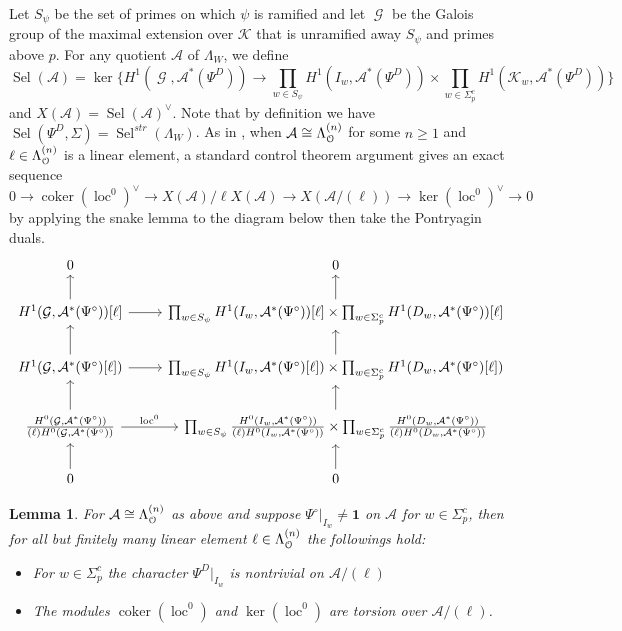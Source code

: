 \documentclass[leqno]{amsart}
\newtheorem{lem}[thm]{Lemma}
\theoremstyle{definition}
\theoremstyle{remark}
\newcommand{\id}{\mathbf{1}}
\newcommand{\eo}{\EuScript{O}}
\DeclareMathOperator{\coker}{coker}
\DeclareMathOperator{\Gal}{\mathcal{G}}
\newcommand{\K}{{\mathcal{K}}} %
\DeclareMathOperator{\loc}{loc}
\DeclareMathOperator{\Sel}{Sel}
\newcommand{\Lda}[1]{\Lambda^{(#1)}}
\begin{document}
Let $S_\psi$ be the set of primes on which $\psi$ is ramified
and let $\Gal$ be the Galois group of the maximal extension
over $\K$ that is unramified away $S_\psi$ and primes above $p$.
For any quotient $\mathcal{A}$ of $\Lambda_W$, we define 
\begin{equation}
    \Sel(\mathcal{A})=
    \ker\big\{
    H^1(\Gal, \mathcal{A}^*(\Psi^D))\to
    \prod_{w\in S_\psi}
    H^1(I_w,\mathcal{A}^*(\Psi^D))\times 
    \prod_{w\in \Sigma_p^c}
    H^1(\K_w,\mathcal{A}^*(\Psi^D))
    \big\}
\end{equation}
and $X(\mathcal{A})=\Sel(\mathcal{A})^\vee$.
Note that by definition we have
$\Sel(\Psi^D,\Sigma)=\Sel^{str}(\Lambda_W)$.
As in \cite[Prop 2.6]{Hsieh2010},
when $\mathcal{A}\cong \Lda{n}_{\eo}$ for some $n\geq 1$
and $\ell\in\Lda{n}_{\eo}$ is a linear element,
a standard control theorem argument gives an exact sequence
$0\to \coker(\loc^0)^\vee\to X(\mathcal{A})/\ell X(\mathcal{A})
\to X(\mathcal{A}/(\ell))\to \ker(\loc^0)^\vee\to 0$
by applying the snake lemma to the diagram below
then take the Pontryagin duals.
\[
\begin{tikzcd}
0 & 0\\
H^1(\Gal,\mathcal{A}^*(\Psi^\circ))[\ell] \arrow[u]\arrow[r] &
\prod_{w\in S_\psi}
H^1(I_w,\mathcal{A}^*(\Psi^\circ))[\ell]\times
\prod_{w\in\Sigma_p^c}
H^1(D_w,\mathcal{A}^*(\Psi^\circ))[\ell] \arrow[u]\\
H^1(\Gal,\mathcal{A}^*(\Psi^\circ)[\ell]) \arrow[u]\arrow[r] &
\prod_{w\in S_\psi}
H^1(I_w,\mathcal{A}^*(\Psi^\circ)[\ell])\times
\prod_{w\in\Sigma_p^c}
H^1(D_w,\mathcal{A}^*(\Psi^\circ)[\ell]) \arrow[u]\\
\frac{H^0(\Gal,\mathcal{A}^*(\Psi^\circ))}
{(\ell)H^0(\Gal,\mathcal{A}^*(\Psi^\circ))}
\arrow[u]\arrow[r,"\loc^0"] &
\prod_{w\in S_\psi}
\frac{H^0(I_w,\mathcal{A}^*(\Psi^\circ))}
{(\ell)H^0(I_w,\mathcal{A}^*(\Psi^\circ))}\times
\prod_{w\in\Sigma_p^c}
\frac{H^0(D_w,\mathcal{A}^*(\Psi^\circ))}
{(\ell)H^0(D_w,\mathcal{A}^*(\Psi^\circ))} \arrow[u]\\
0\arrow[u] & 
0\arrow[u]
\end{tikzcd}
\]

\begin{lem}
For $\mathcal{A}\cong \Lda{n}_{\eo}$ as above
and suppose $\Psi^\circ\vert_{I_w}\neq \id$ on $\mathcal{A}$
for $w\in\Sigma_p^c$,  then
for all but finitely many linear element $\ell\in\Lda{n}_{\eo}$
the followings hold:
\begin{itemize}
\item 
For $w\in\Sigma_p^c$
the character $\Psi^D\vert_{I_w}$ is nontrivial on $\mathcal{A}/(\ell)$
\item 
The modules $\coker(\loc^0)$ and $\ker(\loc^0)$
are torsion over $\mathcal{A}/(\ell)$.
\end{itemize}
\end{lem}
\end{document}
